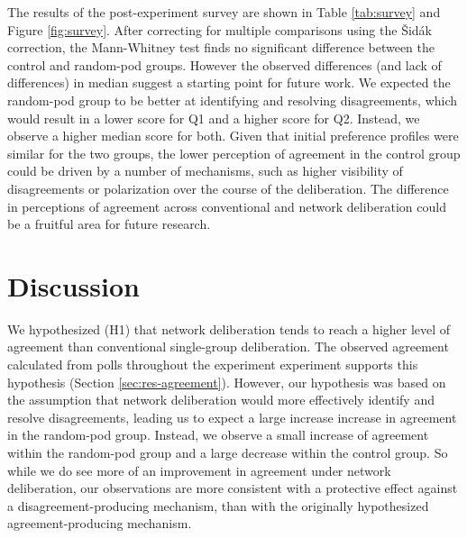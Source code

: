 {The results of the post-experiment survey are shown in Table \ref{tab:survey} and Figure \ref{fig:survey}.
After correcting for multiple comparisons using the Šidák correction, the Mann-Whitney test finds no significant difference between the control and random-pod groups.
However the observed differences (and lack of differences) in median suggest a starting point for future work.
We expected the random-pod group to be better at identifying and resolving disagreements, which would result in a lower score for Q1 and a higher score for Q2.
Instead, we observe a higher median score for both.
Given that initial preference profiles were similar for the two groups, the lower perception of agreement in the control group could be driven by a number of mechanisms, such as higher visibility of disagreements or polarization over the course of the deliberation.
The difference in perceptions of agreement across conventional and network deliberation could be a fruitful area for future research.

\section{Discussion}
\label{sec:discussion}

We hypothesized (H1) that network deliberation tends to reach a higher level of agreement than conventional single-group deliberation.
The observed agreement calculated from polls throughout the experiment experiment supports this hypothesis (Section \ref{sec:res-agreement}).
However, our hypothesis was based on the assumption that network deliberation would more effectively identify and resolve disagreements,
leading us to expect a large increase increase in agreement in the random-pod group.
Instead, we observe a small increase of agreement within the random-pod group and a large decrease within the control group.
So while we do see more of an improvement in agreement under network deliberation, our observations are more consistent with a protective effect against a disagreement-producing mechanism, than with the originally hypothesized agreement-producing mechanism.

}
